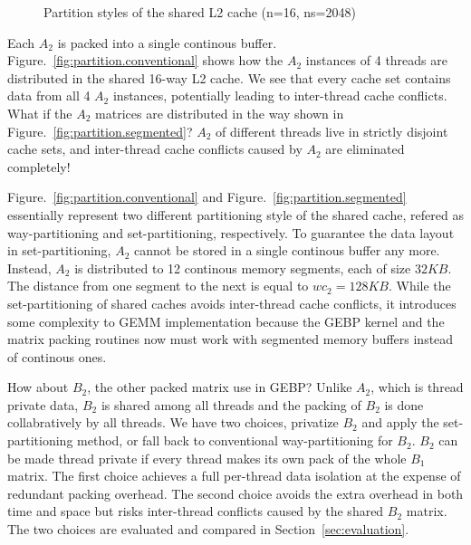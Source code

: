 \begin{figure}
  \centering
  \caption{Partition styles of the shared L2 cache (n=16, ns=2048)}
  \label{fig:partition}
\end{figure}

Each $A_2$ is packed into a single continous buffer.
Figure.~\ref{fig:partition.conventional} shows how the
$A_2$ instances of 4 threads are distributed in the shared 16-way L2 cache.
We see that every cache set contains data from all 4 $A_2$ instances,
potentially leading to inter-thread cache conflicts.
What if the $A_2$ matrices are distributed in the way shown in
Figure.~\ref{fig:partition.segmented}?
$A_2$ of different threads live in strictly disjoint cache sets,
and inter-thread cache conflicts caused by $A_2$ are eliminated completely!

Figure.~\ref{fig:partition.conventional} and Figure.~\ref{fig:partition.segmented}
essentially represent two different partitioning style of the shared cache,
refered as way-partitioning and set-partitioning, respectively.
To guarantee the data layout in set-partitioning,
$A_2$ cannot be stored in a single continous buffer any more.
Instead, $A_2$ is distributed to 12 continous memory segments, each of size $32KB$.
The distance from one segment to the next is equal to $wc_2=128KB$.
While the set-partitioning of shared caches avoids inter-thread cache conflicts,
it introduces some complexity to GEMM implementation
because the GEBP kernel and the matrix packing routines
now must work with segmented memory buffers instead of continous ones.

How about $B_2$, the other packed matrix use in GEBP?
Unlike $A_2$, which is thread private data,
$B_2$ is shared among all threads and
the packing of $B_2$ is done collabratively by all threads.
We have two choices, privatize $B_2$ and apply the set-partitioning method,
or fall back to conventional way-partitioning for $B_2$.
$B_2$ can be made thread private if every thread makes
its own pack of the whole $B_1$ matrix.
The first choice achieves a full per-thread data isolation
at the expense of redundant packing overhead.
The second choice avoids the extra overhead in both time and space
but risks inter-thread conflicts caused by the shared $B_2$ matrix.
The two choices are evaluated and compared in Section~\ref{sec:evaluation}.

